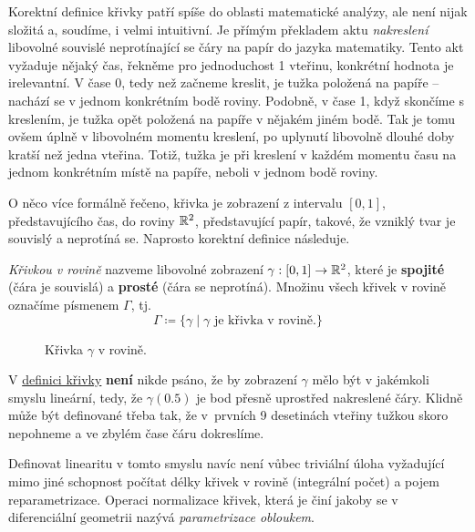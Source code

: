 Korektní definice křivky patří spíše do oblasti matematické analýzy, ale není
nijak složitá a, soudíme, i velmi intuitivní. Je přímým překladem aktu
\emph{nakreslení} libovolné souvislé neprotínající se čáry na papír do jazyka
matematiky. Tento akt vyžaduje nějaký čas, řekněme pro jednoduchost 1 vteřinu,
konkrétní hodnota je irelevantní. V čase 0, tedy než začneme kreslit, je tužka
položená na papíře -- nachází se v jednom konkrétním bodě roviny. Podobně, v
čase 1, když skončíme s kreslením, je tužka opět položená na papíře v nějakém
jiném bodě. Tak je tomu ovšem úplně v libovolném momentu kreslení, po uplynutí
libovolně dlouhé doby kratší než jedna vteřina. Totiž, tužka je při kreslení v
každém momentu času na jednom konkrétním místě na papíře, neboli v jednom bodě
roviny.

O něco více formálně řečeno, křivka je zobrazení z intervalu $[0,1]$,
představujícího čas, do roviny $\mathbb{R}^2$, představující papír, takové, že vzniklý
tvar je souvislý a neprotíná se. Naprosto korektní definice následuje.

\begin{definition}
 \label{def:krivka-v-rovine}
 \emph{Křivkou v rovině} nazveme libovolné zobrazení $\gamma:[0,1] \to \mathbb{R}^2$,
 které je \textbf{spojité} (čára je souvislá) a \textbf{prosté} (čára se
 neprotíná). Množinu všech křivek v rovině označíme písmenem $\Gamma$, tj.
 \[
  \Gamma \coloneqq \{\gamma \mid \gamma \text{ je křivka v rovině.}\}
 \]
\end{definition}

\begin{figure}[h]
 \centering

 \caption{Křivka $\gamma$ v rovině.}
 \label{fig:krivka-v-rovine}
\end{figure}

\begin{warning}
 V \hyperref[def:krivka-v-rovine]{definici křivky} \textbf{není} nikde psáno, že
 by zobrazení $\gamma$ mělo být v jakémkoli smyslu lineární, tedy, že
 $\gamma(0.5)$ je bod přesně uprostřed nakreslené čáry. Klidně může být
 definované třeba tak, že v~prvních 9 desetinách vteřiny tužkou skoro nepohneme
 a ve zbylém čase čáru dokreslíme.

 Definovat linearitu v tomto smyslu navíc není vůbec triviální úloha vyžadující
 mimo jiné schopnost počítat délky křivek v rovině (integrální počet) a pojem
 reparametrizace. Operaci normalizace křivek, která je činí jakoby 
 se v diferenciální geometrii nazývá \emph{parametrizace obloukem}.
\end{warning}

